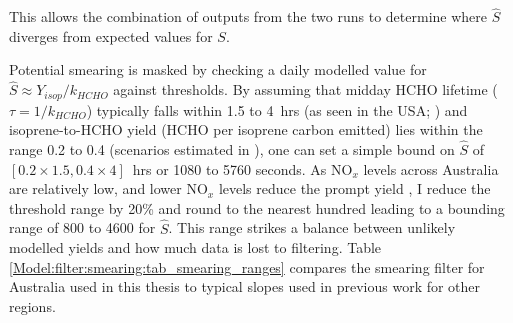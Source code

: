       This allows the combination of outputs from the two runs to determine where $\hat{S}$ diverges from expected values for $S$.
      
      Potential smearing is masked by checking a daily modelled value for $\hat{S} \approx Y_{isop}/k_{HCHO}$ against thresholds.
      By assuming that midday HCHO lifetime ($\tau = 1/k_{HCHO}$) typically falls within 1.5 to 4~hrs (as seen in the USA; \textcite[e.g.,][]{Palmer2006,Wolfe2016}) and isoprene-to-HCHO yield (HCHO per isoprene carbon emitted) lies within the range 0.2 to 0.4 (scenarios estimated in \textcite{Palmer2003}), one can set a simple bound on $\hat{S}$ of $[0.2 \times 1.5, 0.4 \times 4]$~hrs or 1080 to 5760 seconds.
      As NO$_x$ levels across Australia are relatively low, and lower NO$_x$ levels reduce the prompt yield \parencite{Palmer2003,Wolfe2016}, I reduce the threshold range by 20\% and round to the nearest hundred leading to a bounding range of 800 to 4600 for $\hat{S}$. 
      This range strikes a balance between unlikely modelled yields and how much data is lost to filtering.
      Table \ref{Model:filter:smearing:tab_smearing_ranges} compares the smearing filter for Australia used in this thesis to typical slopes used in previous work for other regions.
      
